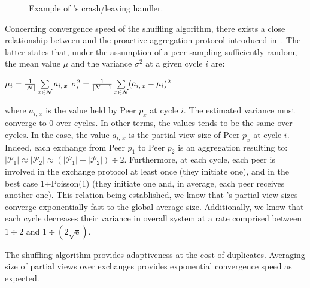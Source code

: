 \begin{figure*}
  \centering
  \hspace{10pt}
  \hspace{10pt}
  \caption{\label{fig:crashexample}Example of \SPRAY's crash/leaving
    handler. }
\end{figure*}

Concerning convergence speed of the shuffling algorithm, there exists
a close relationship between \SPRAY and the proactive aggregation
protocol introduced
in~\cite{jelasity2004epidemic,montresor2004robust}. The latter states
that, under the assumption of a peer sampling sufficiently random, the
mean value $\mu$ and the variance $\sigma^2$ at a given cycle $i$ are:
\begin{center}
  $\mu_i = {1\over{|\mathcal{N}|}} \sum\limits_{x \in \mathcal{N}} a_{i,\,x}$
  \hfill
  $\sigma^2_i = {1\over{|\mathcal{N}|-1}}\sum\limits_{x \in \mathcal{N}}
  (a_{i,\,x} - \mu_i)^2$
\end{center}
where $a_{i,\,x}$ is the value held by Peer $p_x$ at cycle $i$. The estimated
variance must converge to $0$ over cycles. In other terms, the values tends to
be the same over cycles. In the \SPRAY case, the value $a_{i,\,x}$ is the
partial view size of Peer $p_x$ at cycle $i$. Indeed, each exchange from Peer
$p_1$ to Peer $p_2$ is an aggregation resulting to:
$|\mathcal{P}_1|\approx|\mathcal{P}_2|\approx{(|\mathcal{P}_1| +
  |\mathcal{P}_2|) \div 2}$.
Furthermore, at each cycle, each peer is involved in the exchange protocol at
least once (they initiate one), and in the best case 1+Poisson(1) (they
initiate one and, in average, each peer receives another one). This relation
being established, we know that \SPRAY's partial view sizes converge
exponentially fast to the global average size. Additionally, we know that each
cycle decreases their variance in overall system at a rate comprised between
${1\div 2}$ and $1\div ({2\sqrt{\text{e}}})$.

The shuffling algorithm provides adaptiveness at the cost of
duplicates. Averaging size of partial views over exchanges provides exponential
convergence speed as expected.

